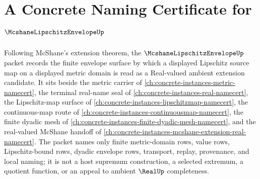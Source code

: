 \chapter{A Concrete Naming Certificate for $\McshaneLipschitzEnvelopeUp$}
\label{ch:concrete-instances-mcshane-lipschitz-envelope-namecert}

Following McShane's extension theorem, the $\McshaneLipschitzEnvelopeUp$ packet records the finite envelope surface by which a displayed Lipschitz source map on a displayed metric domain is read as a Real-valued ambient extension candidate. It sits beside the metric carrier of \autoref{ch:concrete-instances-metric-namecert}, the terminal real-name seal of \autoref{ch:concrete-instances-real-namecert}, the Lipschitz-map surface of \autoref{ch:concrete-instances-lipschitzmap-namecert}, the continuous-map route of \autoref{ch:concrete-instances-continuousmap-namecert}, the finite dyadic mesh of \autoref{ch:concrete-instances-finite-dyadic-mesh-namecert}, and the real-valued McShane handoff of \autoref{ch:concrete-instances-mcshane-extension-real-namecert}. The packet names only finite metric-domain rows, value rows, Lipschitz-bound rows, dyadic envelope rows, transport, replay, provenance, and local naming; it is not a host supremum construction, a selected extremum, a quotient function, or an appeal to ambient $\RealUp$ completeness.

